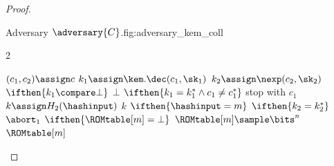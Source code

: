 \begin{proof}
\begin{itemize}
\begin{gamefigure}{Adversary $\adversary{C}$.}{fig:adversary_kem_coll}
\begin{games}{2}
\begin{gameenv}{\oracledec}
                                                                                    \State $(c_1, c_2) \assign c$
                                                                                    \State $k_1 \assign \kem.\dec(c_1, \sk_1)$
                                                                                    \State $k_2 \assign \nexp(c_2, \sk_2)$
                                                                                    \State $\ifthen{k_1 \compare \bot}$
                                                                                        \State \quad \Return $\bot$
                                                                                        \State $\ifthen{k_1 = k^*_1 \wedge c_1 \neq c^*_1}$
                                                                                            \State \quad stop with $c_1$
                                                                                            \State $k \assign H_2(\hashinput)$
                                                                                            \State \Return $k$
                                                                                            \Statex
                                                                                            \State \underline{}
                                                                                            \State $\ifthen{\hashinput = m}$
                                                                                                \State \quad $\ifthen{k_2 = k^*_2}$
                                                                                                    \State \qquad $\abort_1$
                                                                                                    \State $\ifthen{\ROMtable[m] = \bot}$
                                                                                                        \State \quad $\ROMtable[m] \sample \bits^{n}$
                                                                                                        \State \Return $\ROMtable[m]$
                                                                                                    \end{gameenv}
                                                                                                \end{games}
                                                                                            \end{gamefigure}


\end{itemize}
\end{proof}
